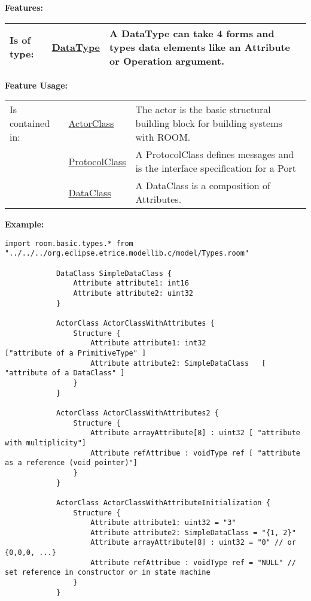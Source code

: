 	\begingroup
	\textbf{Features:}
	\renewcommand{\arraystretch}{1.8} %
	\begin{longtable}{l|l p{}}
		\hline
	Is of type: & \tabitem \hyperlink{ref:DataType}{DataType}  & A DataType can take 4 forms and types data elements like an Attribute or Operation argument.\\
	\hline
	\end{longtable}
	\endgroup
		
	\begingroup
	\textbf{Feature Usage:}
	\renewcommand{\arraystretch}{1.8} %
	\begin{longtable}{l|l p{}}
		\hline
	Is contained in: & \tabitem \hyperlink{ref:ActorClass}{ActorClass}  & The actor is the basic structural building block for building systems with ROOM.\\
	& \tabitem \hyperlink{ref:ProtocolClass}{ProtocolClass}  & A ProtocolClass defines messages and is the interface specification for a Port \\
	& \tabitem \hyperlink{ref:DataClass}{DataClass}  & A DataClass is a composition of Attributes. \\
	\hline
	\end{longtable}
	\endgroup
		
	\textbf{Example:}
	
			\begin{lstlisting}[language=ROOM]
			import room.basic.types.* from "../../../org.eclipse.etrice.modellib.c/model/Types.room"
			
			DataClass SimpleDataClass {
				Attribute attribute1: int16
				Attribute attribute2: uint32
			}
		
			ActorClass ActorClassWithAttributes {
				Structure {
					Attribute attribute1: int32 			["attribute of a PrimitiveType" ]
					Attribute attribute2: SimpleDataClass 	[ "attribute of a DataClass" ]
				}
			}
		
			ActorClass ActorClassWithAttributes2 {
				Structure {
					Attribute arrayAttribute[8] : uint32 [ "attribute with multiplicity"]
					Attribute refAttribue : voidType ref [ "attribute as a reference (void pointer)"]
				}
			}
		
			ActorClass ActorClassWithAttributeInitialization {
				Structure {
					Attribute attribute1: uint32 = "3"
					Attribute attribute2: SimpleDataClass = "{1, 2}"
					Attribute arrayAttribute[8] : uint32 = "0" // or {0,0,0, ...}
					Attribute refAttribue : voidType ref = "NULL" // set reference in constructor or in state machine
				}
			}
			\end{lstlisting}
	

